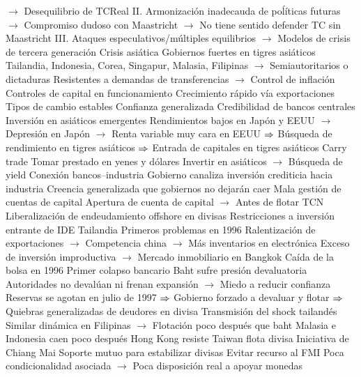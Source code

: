 \documentclass{nuevotema}
\begin{document}
\begin{esquemal}
				\4[] $\to$ Desequilibrio de TCReal
				\4[] II. Armonización inadecauda de poĺíticas futuras
				\4[] $\to$ Compromiso dudoso con Maastricht
				\4[] $\to$ No tiene sentido defender TC sin Maastricht
				\4[] III. Ataques especulativos/múltiples equilibrios
				\4[] $\to$ Modelos de crisis de tercera generación
			\3 Crisis asiática
				\4 Gobiernos fuertes en tigres asiáticos
				\4[] Tailandia, Indonesia, Corea, Singapur, Malasia, Filipinas
				\4[] $\to$ Semiautoritarios o dictaduras
				\4[] Resistentes a demandas de transferencias
				\4[] $\to$ Control de inflación
				\4 Controles de capital en funcionamiento
				\4 Crecimiento rápido vía exportaciones
				\4 Tipos de cambio estables
				\4[] Confianza generalizada
				\4[] Credibilidad de bancos centrales
				\4 Inversión en asiáticos emergentes
				\4[] Rendimientos bajos en Japón y EEUU
				\4[] $\to$ Depresión en Japón
				\4[] $\to$ Renta variable muy cara en EEUU
				\4[] $\Rightarrow$ Búsqueda de rendimiento en tigres asiáticos
				\4[] $\Rightarrow$ Entrada de capitales en tigres asiáticos
				\4 Carry trade
				\4[] Tomar prestado en yenes y dólares
				\4[] Invertir en asiáticos
				\4[] $\to$ Búsqueda de yield
				\4 Conexión bancos--industria
				\4[] Gobierno canaliza inversión crediticia hacia industria
				\4[] Creencia generalizada que gobiernos no dejarán caer
				\4 Mala gestión de cuentas de capital
				\4[] Apertura de cuenta de capital
				\4[] $\to$ Antes de flotar TCN
				\4[] Liberalización de endeudamiento offshore en divisas
				\4[] Restricciones a inversión entrante de IDE
				\4 Tailandia
				\4[] Primeros problemas en 1996
				\4[] Ralentización de exportaciones
				\4[] $\to$ Competencia china
				\4[] $\to$ Más inventarios en electrónica
				\4[] Exceso de inversión improductiva
				\4[] $\to$ Mercado inmobiliario en Bangkok
				\4[] Caída de la bolsa en 1996
				\4[] Primer colapso bancario
				\4[] Baht sufre presión devaluatoria
				\4[] Autoridades no devalúan ni frenan expansión
				\4[] $\to$ Miedo a reducir confianza
				\4[] Reservas se agotan en julio de 1997
				\4[] $\Rightarrow$ Gobierno forzado a devaluar y flotar
				\4[] $\Rightarrow$ Quiebras generalizadas de deudores en divisa
				\4 Transmisión del shock tailandés
				\4[] Similar dinámica en Filipinas
				\4[] $\to$ Flotación poco después que baht
				\4[] Malasia e Indonesia caen poco después
				\4[] Hong Kong resiste
				\4[] Taiwan flota divisa
				\4 Iniciativa de Chiang Mai
				\4[] Soporte mutuo para estabilizar divisas
				\4[] Evitar recurso al FMI
				\4[] Poca condicionalidad asociada
				\4[] $\to$ Poca disposición real a apoyar monedas

\end{esquemal}
\end{document}
